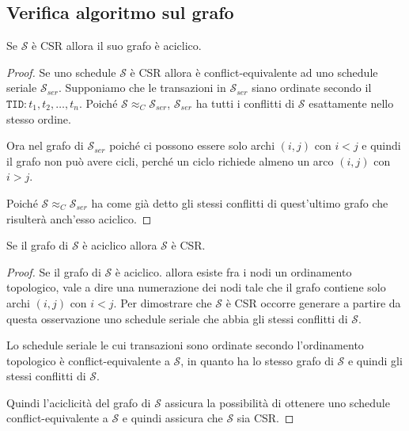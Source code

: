 \documentclass[oneside,a4paper,11pt]{book}
\theoremstyle{italicstyle}
\theoremstyle{normStyle}
\begin{document}
\subsection{Verifica algoritmo sul grafo}
\begin{tcolorbox}
  Se $\mathcal{S}$ è CSR allora il suo grafo è aciclico. 
\end{tcolorbox}
\begin{proof}
Se uno schedule $\mathcal{S}$ 
è CSR allora è conflict-equivalente ad uno schedule seriale $\mathcal{S}_{ser}$.
Supponiamo che le transazioni in $\mathcal{S}_{ser}$ siano ordinate secondo il $\texttt{TID}: t_1,t_2,\dots,t_n$. 
Poiché $\mathcal{S} \approx_C \mathcal{S}_{ser}$, $\mathcal{S}_{ser}$ ha tutti i conflitti 
di $\mathcal{S}$ esattamente nello stesso ordine.

Ora nel grafo di $\mathcal{S}_{ser}$ poiché ci possono essere solo archi $(i,j)$
con $i<j$ e quindi il grafo non può avere cicli, perché un ciclo richiede almeno un arco $(i,j)$
con $i>j$.

Poiché $\mathcal{S} \approx_C \mathcal{S}_{ser}$ ha come già detto gli stessi 
conflitti di quest'ultimo grafo che risulterà anch'esso aciclico.
\end{proof}
\begin{tcolorbox}
  Se il grafo di $\mathcal{S}$ è aciclico allora $\mathcal{S}$ è CSR.
\end{tcolorbox}
\begin{proof}
Se il grafo di $\mathcal{S}$ è aciclico. allora esiste fra i nodi un ordinamento 
topologico, vale a dire una numerazione dei nodi tale che il grafo contiene solo archi 
$(i,j)$ con $i<j$. Per dimostrare che $\mathcal{S}$ è CSR occorre generare a partire da questa osservazione 
uno schedule seriale che abbia gli stessi conflitti di $\mathcal{S}$.

Lo schedule seriale le cui transazioni sono ordinate secondo l'ordinamento topologico 
è conflict-equivalente a $\mathcal{S}$, in quanto ha lo stesso grafo di $\mathcal{S}$ e 
quindi gli stessi conflitti di $\mathcal{S}$.

Quindi l'aciclicità del grafo di $\mathcal{S}$ assicura la possibilità di ottenere 
uno schedule conflict-equivalente a $\mathcal{S}$ e quindi assicura che 
$\mathcal{S}$ sia CSR.
\end{proof}
\end{document}
